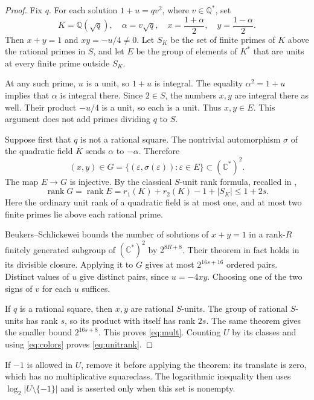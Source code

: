 \documentclass[11pt,letterpaper]{article}
\theoremstyle{remark}\newtheorem{remark}[theorem]{Remark}
\newcommand{\Q}{\mathbb Q}
\newcommand{\C}{\mathbb C}
\newcommand{\rk}{\operatorname{rank}}
\begin{document}
\begin{proof}
Fix $q$. For each solution $1+u=qv^2$, where $v\in\Q^*$, set
\[
 K=\Q(\sqrt q),\quad \alpha=v\sqrt q,\quad
 x=\frac{1+\alpha}{2},\quad y=\frac{1-\alpha}{2}.
\]
Then $x+y=1$ and $xy=-u/4\ne0$. Let $S_K$ be the set of finite primes of $K$ above the rational primes in $S$, and let $E$ be the group of elements of $K^*$ that are units at every finite prime outside $S_K$.

At any such prime, $u$ is a unit, so $1+u$ is integral. The equality $\alpha^2=1+u$ implies that $\alpha$ is integral there. Since $2\in S$, the numbers $x,y$ are integral there as well. Their product $-u/4$ is a unit, so each is a unit. Thus $x,y\in E$. This argument does not add primes dividing $q$ to $S$.

Suppose first that $q$ is not a rational square. The nontrivial automorphism $\sigma$ of the quadratic field $K$ sends $\alpha$ to $-\alpha$. Therefore
\[
 (x,y)\in G=\{(\varepsilon,\sigma(\varepsilon)):\varepsilon\in E\}
 \subset(\C^*)^2.
\]
The map $E\to G$ is injective. By the classical $S$-unit rank formula, recalled in \cite[Section 1.1]{FM},
\[
 \rk G=\rk E=r_1(K)+r_2(K)-1+|S_K|\le1+2s.
\]
Here the ordinary unit rank of a quadratic field is at most one, and at most two finite primes lie above each rational prime.

Beukers--Schlickewei \cite[Theorem 1.1]{BS} bounds the number of solutions of $x+y=1$ in a rank-$R$ finitely generated subgroup of $(\C^*)^2$ by $2^{8R+8}$. Their theorem in fact holds in its divisible closure. Applying it to $G$ gives at most $2^{16s+16}$ ordered pairs. Distinct values of $u$ give distinct pairs, since $u=-4xy$. Choosing one of the two signs of $v$ for each $u$ suffices.

If $q$ is a rational square, then $x,y$ are rational $S$-units. The group of rational $S$-units has rank $s$, so its product with itself has rank $2s$. The same theorem gives the smaller bound $2^{16s+8}$. This proves \eqref{eq:mult}. Counting $U$ by its classes and using \eqref{eq:colors} proves \eqref{eq:unitrank}.
\end{proof}

If $-1$ is allowed in $U$, remove it before applying the theorem: its translate is zero, which has no multiplicative squareclass. The logarithmic inequality then uses $\log_2|U\setminus\{-1\}|$ and is asserted only when this set is nonempty.
\end{document}
